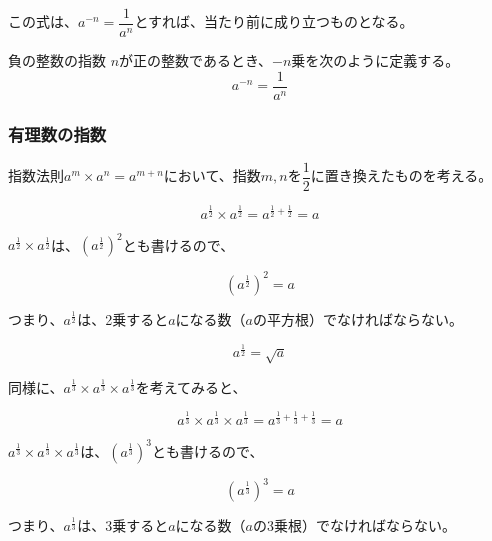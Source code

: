 \documentclass[../math-imaging]{subfiles}
\begin{document}
この式は、$a^{-n}= \dfrac{1}{a^n}$とすれば、当たり前に成り立つものとなる。

\begin{definition}{負の整数の指数}
  \newline
  $n$が正の整数であるとき、$-n$乗を次のように定義する。
  \LARGE
  \begin{equation}
    a^{-n} = \dfrac{1}{a^n}
  \end{equation}
\end{definition}

\subsubsection{有理数の指数}

指数法則$a^m \times a^n = a^{m+n}$において、指数$m, n$を$\dfrac{1}{2}$に置き換えたものを考える。

\begin{equation}
  a^{\frac{1}{2}} \times a^{\frac{1}{2}} = a^{\frac{1}{2} + \frac{1}{2}} = a
\end{equation}

$a^{\frac{1}{2}} \times a^{\frac{1}{2}}$は、$(a^{\frac{1}{2}})^2$とも書けるので、

\begin{equation}
  (a^{\frac{1}{2}})^2 = a
\end{equation}

つまり、$a^{\frac{1}{2}}$は、2乗すると$a$になる数（$a$の平方根）でなければならない。

\begin{equation}
  a^{\frac{1}{2}} = \sqrt{a}
\end{equation}

同様に、$a^{\frac{1}{3}} \times a^{\frac{1}{3}} \times a^{\frac{1}{3}}$を考えてみると、

\begin{equation}
  a^{\frac{1}{3}} \times a^{\frac{1}{3}} \times a^{\frac{1}{3}} = a^{\frac{1}{3} + \frac{1}{3} + \frac{1}{3}} = a
\end{equation}

$a^{\frac{1}{3}} \times a^{\frac{1}{3}} \times a^{\frac{1}{3}}$は、$(a^{\frac{1}{3}})^3$とも書けるので、

\begin{equation}
  (a^{\frac{1}{3}})^3 = a
\end{equation}

つまり、$a^{\frac{1}{3}}$は、3乗すると$a$になる数（$a$の3乗根）でなければならない。
\end{document}
